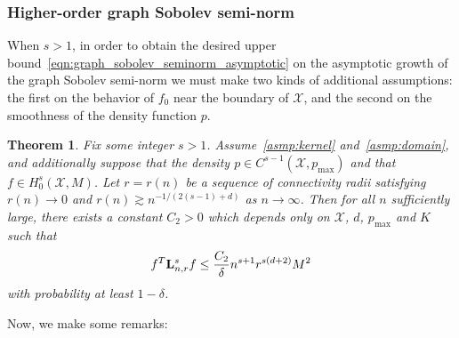 \documentclass{article}
\newcommand{\1}{\mathbf{1}}
\newcommand{\Lap}{{\bf L}}
\newcommand{\Xset}{\mathcal{X}}
\theoremstyle{alden}
\theoremstyle{aldenthm}
\newtheorem{theorem}{Theorem}
\theoremstyle{definition}
\theoremstyle{remark}
\begin{document}
\subsubsection{Higher-order graph Sobolev semi-norm}
\label{subsec:higher_order_graph_sobolev_seminorm}
When $s > 1$, in order to obtain the desired upper bound~\eqref{eqn:graph_sobolev_seminorm_asymptotic} on the asymptotic growth of the graph Sobolev semi-norm we must make two kinds of additional assumptions: the first on the behavior of $f_0$ near the boundary of $\Xset$, and the second on the smoothness of the density function $p$.
\begin{theorem}
	\label{thm:graph_sobolev_seminorm}
	Fix some integer $s > 1$. Assume~\ref{asmp:kernel} and~\ref{asmp:domain}, and additionally suppose that the density $p \in C^{s - 1}(\Xset,p_{\max})$ and that $f \in H_0^s(\Xset,M)$. Let $r = r(n)$ be a sequence of connectivity radii satisfying $r(n) \to 0$ and $r(n) \gtrsim n^{-1/(2(s - 1) +d)}$ as $n \to \infty$. Then for all $n$ sufficiently large, there exists a constant $C_2 > 0$ which depends only on $\Xset$, $d$, $p_{\max}$ and $K$ such that
	\begin{equation}
	\label{eqn:graph_sobolev_seminorm}
	f^T \Lap_{n,r}^s f \leq \frac{C_2}{\delta} n^{s + 1} r^{s(d + 2)}M^2
	\end{equation}
	with probability at least $1 - \delta$.
\end{theorem}
Now, we make some remarks:
\end{document}
